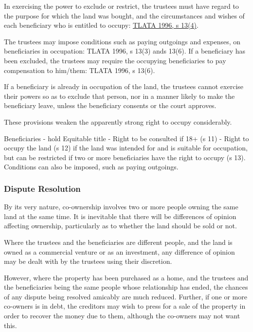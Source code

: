 \documentclass[
]{article}
\newenvironment{Shaded}{}{}
\newcommand{\NormalTok}[1]{#1}
\begin{document}
In exercising the power to exclude or restrict, the trustees must have
regard to the purpose for which the land was bought, and the
circumstances and wishes of each beneficiary who is entitled to occupy:
\href{https://www.legislation.gov.uk/ukpga/1996/47/section/13}{TLATA
1996, s 13(4)}.

The trustees may impose conditions such as paying outgoings and
expenses, on beneficiaries in occupation: TLATA 1996, s 13(3) ands
13(6). If a beneficiary has been excluded, the trustees may require the
occupying beneficiaries to pay compensation to him/them: TLATA 1996, s
13(6).

If a beneficiary is already in occupation of the land, the trustees
cannot exercise their powers so as to exclude that person, nor in a
manner likely to make the beneficiary leave, unless the beneficiary
consents or the court approves.

These provisions weaken the apparently strong right to occupy
considerably.

\begin{Shaded}
\begin{Highlighting}[]
\NormalTok{Beneficiaries {-} hold Equitable title}
\NormalTok{{-} Right to be consulted if 18+ (s 11)}
\NormalTok{{-} Right to occupy the land (s 12) if the land was intended for and is suitable for occupation, but can be restricted if two or more beneficiaries have the right to occupy (s 13). Conditions can also be imposed, such as paying outgoings.}
\end{Highlighting}
\end{Shaded}

\hypertarget{dispute-resolution}{%
\subsubsection{Dispute Resolution}\label{dispute-resolution}}

By its very nature, co-ownership involves two or more people owning the
same land at the same time. It is inevitable that there will be
differences of opinion affecting ownership, particularly as to whether
the land should be sold or not.

Where the trustees and the beneficiaries are different people, and the
land is owned as a commercial venture or as an investment, any
difference of opinion may be dealt with by the trustees using their
discretion.

However, where the property has been purchased as a home, and the
trustees and the beneficiaries being the same people whose relationship
has ended, the chances of any dispute being resolved amicably are much
reduced. Further, if one or more co-owners is in debt, the creditors may
wish to press for a sale of the property in order to recover the money
due to them, although the co-owners may not want this.
\end{document}
